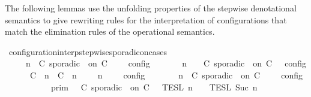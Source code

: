 \begin{isabellebody}
%
\endisatagproof
{\isafoldproof}%
%
\isadelimproof
%
\endisadelimproof
%
\begin{isamarkuptext}%
The following lemmas use the unfolding properties of the stepwise denotational 
  semantics to give rewriting rules for the interpretation of configurations that
  match the elimination rules of the operational semantics.%
\end{isamarkuptext}\isamarkuptrue%
\isamarkupfalse%
\ configuration{\isacharunderscore}interp{\isacharunderscore}stepwise{\isacharunderscore}sporadicon{\isacharunderscore}cases{\isacharcolon}\isanewline
\ \ \ {\isacartoucheopen}{\isasymlbrakk}\ {\isasymGamma}{\isacharcomma}\ n\ {\isasymturnstile}\ {\isacharparenleft}{\isacharparenleft}C\ sporadic\ {\isasymtau}\ on\ C\ {\isacharhash}\ {\isasymPsi}{\isacharparenright}\ {\isasymtriangleright}\ {\isasymPhi}\ {\isasymrbrakk}\isactrlsub c\isactrlsub o\isactrlsub n\isactrlsub f\isactrlsub i\isactrlsub g\isanewline
\ \ \ \ {\isacharequal}\ {\isasymlbrakk}\ {\isasymGamma}{\isacharcomma}\ n\ {\isasymturnstile}\ {\isasymPsi}\ {\isasymtriangleright}\ {\isacharparenleft}{\isacharparenleft}C\ sporadic\ {\isasymtau}\ on\ C\ {\isacharhash}\ {\isasymPhi}{\isacharparenright}\ {\isasymrbrakk}\isactrlsub c\isactrlsub o\isactrlsub n\isactrlsub f\isactrlsub i\isactrlsub g\isanewline
\ \ \ \ {\isasymunion}\ {\isasymlbrakk}\ {\isacharparenleft}{\isacharparenleft}C\ {\isasymUp}\ n{\isacharparenright}\ {\isacharhash}\ {\isacharparenleft}C\ {\isasymDown}\ n\ {\isacharat}\ {\isasymtau}{\isacharparenright}\ {\isacharhash}\ {\isasymGamma}{\isacharparenright}{\isacharcomma}\ n\ {\isasymturnstile}\ {\isasymPsi}\ {\isasymtriangleright}\ {\isasymPhi}\ {\isasymrbrakk}\isactrlsub c\isactrlsub o\isactrlsub n\isactrlsub f\isactrlsub i\isactrlsub g{\isacartoucheclose}\isanewline
%
\isadelimproof
%
\endisadelimproof
%
\isatagproof
{}\isamarkupfalse%
\ {\isacharminus}\isanewline
\ \ \isamarkupfalse%
\ {\isacartoucheopen}{\isasymlbrakk}\ {\isasymGamma}{\isacharcomma}\ n\ {\isasymturnstile}\ {\isacharparenleft}C\ sporadic\ {\isasymtau}\ on\ C\ {\isacharhash}\ {\isasymPsi}\ {\isasymtriangleright}\ {\isasymPhi}\ {\isasymrbrakk}\isactrlsub c\isactrlsub o\isactrlsub n\isactrlsub f\isactrlsub i\isactrlsub g\isanewline
\ \ \ \ \ \ \ \ {\isacharequal}\ {\isasymlbrakk}{\isasymlbrakk}\ {\isasymGamma}\ {\isasymrbrakk}{\isasymrbrakk}\isactrlsub p\isactrlsub r\isactrlsub i\isactrlsub m\ {\isasyminter}\ {\isasymlbrakk}{\isasymlbrakk}\ {\isacharparenleft}C\ sporadic\ {\isasymtau}\ on\ C\ {\isacharhash}\ {\isasymPsi}\ {\isasymrbrakk}{\isasymrbrakk}\isactrlsub T\isactrlsub E\isactrlsub S\isactrlsub L\isactrlbsup {\isasymge}\ n\isactrlesup \ {\isasyminter}\ {\isasymlbrakk}{\isasymlbrakk}\ {\isasymPhi}\ {\isasymrbrakk}{\isasymrbrakk}\isactrlsub T\isactrlsub E\isactrlsub S\isactrlsub L\isactrlbsup {\isasymge}\ Suc\ n\isactrlesup {\isacartoucheclose}\isanewline

\end{isabellebody}
